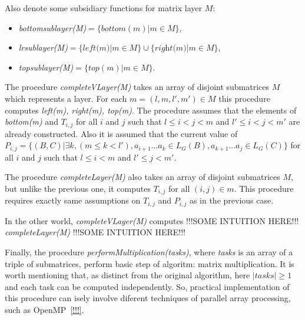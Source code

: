 Also denote some subsidiary functions for matrix layer $M$:
 \begin{itemize}
  \item \textit{bottomsublayer(M)}$ = \{bottom(m) | m \in M \}$,
  \item \textit{lrsublayer(M)}$ = \{\textit{left(m)} | m \in M \} \cup \{\textit{right(m)} | m \in M \}$,
  \item \textit{topsublayer(M)}$ = \{top(m) | m \in M \}$.
\end{itemize}

The procedure \textit{completeVLayer(M)} takes an array of disjoint submatrices $M$ which represents a layer.
For each $m = (l, m, l', m') \in M$ this procedure computes \textit{left(m), right(m), top(m)}.
The procedure assumes that the elements of \textit{bottom(m)} and $T_{i, j}$ for all $i$ and $j$ such that $l \leq i < j < m$ and $  l' \leq i < j < m'$ are already constructed.
Also it is assumed that the current value of
$P_{i, j} =  \{ (B, C) | \exists k, (m \le k < l'), a_{i + 1} \dots a_{k} \in L_G(B), a_{k + 1} \dots a_{j} \in L_G(C)\} $ for all $i$ and $j$ such that $l \leq i < m$ and $l' \leq j < m'$.

The procedure \textit{completeLayer(M)} also takes an array of disjoint submatrices $M$, but unlike the previous one, it computes $T_{i, j}$ for all $(i, j) \in m$.
This procedure requires exactly same assumptions on $T_{i, j}$  and $P_{i, j}$  as in the previous case.

In the other world, \textit{completeVLayer(M)} computes !!!SOME INTUITION HERE!!! \textit{completeLayer(M)} !!!SOME INTUITION HERE!!!

Finally, the procedure \textit{performMultiplication(tasks)}, where \textit{tasks} is an array of a triple of submatrices, perform basic step of algoritm: matrix multiplication. It is worth mentioning that, as distinct from the original algorithm, here $|tasks| \ge 1$ and each task can be computed independently.
So, practical implementation of this procedure can isely involve diferent techniques of parallel array processing, such as OpenMP~\ref{!!!}.

